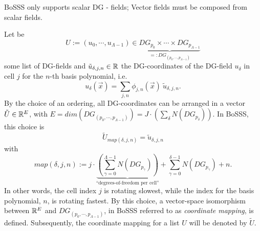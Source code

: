 \begin{myRem}
BoSSS only supports scalar DG - fields; Vector fields must be composed
from scalar fields.
\end{myRem}

\begin{myDefRem}
Let be
\[
  U := (u_0,\cdots,u_{\Lambda-1})
  \in
  \underbrace{
  DG_{p_0} \times \cdots \times DG_{p_{\Lambda-1}}
  }_{
  =: DG_{( p_0, \cdots, p_{\Lambda-1})}
  }
\]
some list of DG-fields and $\tilde{u}_{\delta,j,n} \in \mathbb{R}$
the DG-coordinates of the DG-field $u_\delta$ in cell $j$ for the $n$-th basis polynomial,
i.e.
\[
  u_\delta(\vec{x}) = \sum_{j,n} \phi_{j,n}(\vec{x}) \ \tilde{u}_{\delta,j,n}.
\]
By the choice of an ordering,
all DG-coordinates can be arranged in a vector $\tilde{U} \in \mathbb{R}^E$,
with $E=dim(DG_{( p_0, \cdots, p_{\Lambda-1})}) = J \cdot \left( \sum_\delta N(DG_{p_\delta}) \right)$.
In BoSSS, this choice is
\[
 \tilde{U}_{map(\delta,j,n)} = \tilde{u}_{\delta,j,n}
\]
with
\[
 map(\delta,j,n) :=
   j \cdot \underbrace{
             \left( \sum_{\gamma = 0}^{\Lambda-1} N(DG_{p_\gamma})  \right)
             }_{ \textrm{``degrees-of-freedom per cell''}}
   + \sum_{\gamma = 0}^{\delta-1} N(DG_{p_\gamma})
   + n.
\]
In other words, the cell index $j$ is rotating slowest, while the index for the basis polynomial, $n$,
is rotating fastest.
By this choice, a vector-space isomorphism between $\mathbb{R}^E$ and $DG_{( p_0, \cdots, p_{\Lambda-1})}$,
in BoSSS referred to as \emph{coordinate mapping}, is defined.
Subsequently, the coordinate mapping for a list $U$ will be denoted by $\tilde{U}$.
\end{myDefRem}


